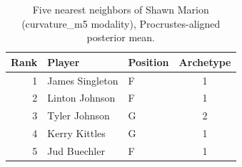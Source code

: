 \begin{table}[htbp]
  \centering\small
  \begin{tabular}{rllc}
    \toprule
    Rank & Player & Position & Archetype \\
    \midrule
    1 & James Singleton & F & 1 \\
    2 & Linton Johnson & F & 1 \\
    3 & Tyler Johnson & G & 2 \\
    4 & Kerry Kittles & G & 1 \\
    5 & Jud Buechler & F & 1 \\
    \bottomrule
  \end{tabular}
  \caption{Five nearest neighbors of Shawn Marion (curvature_m5 modality), Procrustes-aligned posterior mean.}
  \label{tab:Shawn_Marion_neighbors_curvature_m5}
\end{table}

